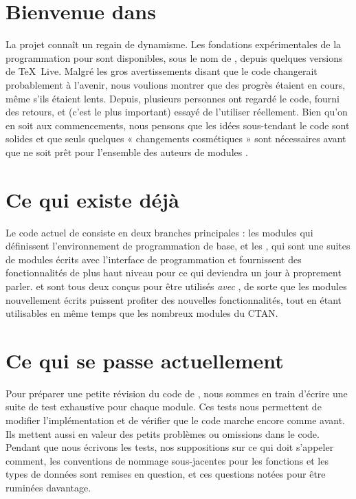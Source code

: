 




\section{Bienvenue dans \latexx}

La projet \latexx connaît un regain de dynamisme. Les fondations
expérimentales de la programmation pour \latexx sont disponibles, sous le nom
de , depuis quelques versions de \TeX\ Live. Malgré les gros
avertissements disant que le code changerait probablement à l'avenir, nous
voulions montrer que des progrès étaient en cours, même s'ils étaient lents.
Depuis, plusieurs personnes ont regardé le code, fourni des retours, et (c'est
le plus important) essayé de l'utiliser réellement. Bien qu'on en soit aux
commencements, nous pensons que les idées sous-tendant le code sont solides et
que seuls quelques « changements cosmétiques » sont nécessaires avant que
 ne soit prêt pour l'ensemble des auteurs de modules \latex.

\section{Ce qui existe déjà}

Le code actuel de \latexx consiste en deux branches principales : les modules
 qui définissent l'environnement de programmation de base, et les
, qui sont une suites de modules écrits avec l'interface de
programmation  et fournissent des fonctionnalités de plus haut
niveau pour ce qui deviendra un jour \latexx à proprement parler. 
et  sont tous deux conçus pour être utilisés \emph{avec}
\latexe, de sorte que les modules nouvellement écrits puissent profiter des
nouvelles fonctionnalités, tout en étant utilisables en même temps que les
nombreux modules  du CTAN.

\section{Ce qui se passe actuellement}

Pour préparer une petite révision du code de , nous sommes en train
d'écrire une suite de test exhaustive pour chaque module. Ces tests nous
permettent de modifier l'implémentation et de vérifier que le code marche
encore comme avant. Ils mettent aussi en valeur des petits problèmes ou
omissions dans le code. Pendant que nous écrivons les tests, nos suppositions
sur ce qui doit s'appeler comment, les conventions de nommage sous-jacentes
pour les fonctions et les types de données sont remises en question, et
ces questions notées pour être ruminées davantage.

